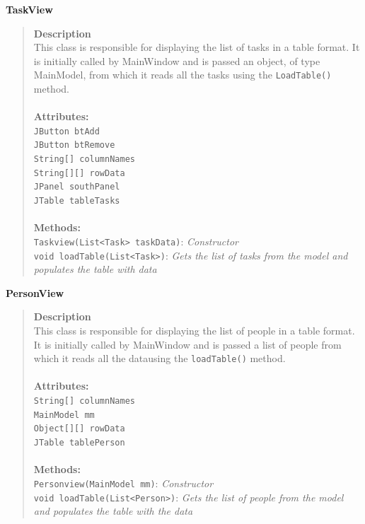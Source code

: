 \documentclass[12pt]{article}
\begin{document}
{\bf TaskView}
\begin{quote}
{\bf Description}\\
This class is responsible for displaying the list of tasks in a table format. It is initially called by MainWindow and is passed an object, of type MainModel, from which it reads all the tasks using the \texttt{LoadTable()} method.\\\\
{\bf Attributes:}\\
\texttt{JButton btAdd}\\
\texttt{JButton btRemove}\\
\texttt{String[] columnNames}\\
\texttt{String[][] rowData}\\
\texttt{JPanel southPanel}\\
\texttt{JTable tableTasks}\\\\
{\bf Methods:}\\
\texttt{Taskview(List<Task> taskData)}:  \emph{Constructor}\\
\texttt{void loadTable(List<Task>)}: \emph{ Gets the list of tasks from the model and populates the table with data}
\end{quote}

{\bf PersonView}
\begin{quote}
{\bf Description}\\
This class is responsible for displaying the list of people in a table format. It is initially called by MainWindow and is passed a list of people from which it reads all the datausing the \texttt{loadTable()} method.\\\\
{\bf Attributes:}\\
\texttt{String[] columnNames}\\
\texttt{MainModel mm}\\
\texttt{Object[][] rowData}\\
\texttt{JTable tablePerson}\\\\
{\bf Methods:}\\
\texttt{Personview(MainModel mm)}:  \emph{Constructor}\\
\texttt{void loadTable(List<Person>)}:  \emph{Gets the list of people from the model and populates the table with the data}
\end{quote}
\end{document}
